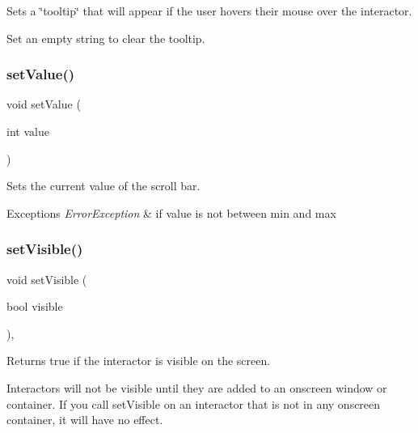 Sets a \char`\"{}tooltip\char`\"{} that will appear if the user hovers their mouse over the interactor. 

Set an empty string to clear the tooltip. \mbox{\label{classGScrollBar_a23d79e21b8ed72e19278ca31d47b8c87}} 
\subsubsection{\texorpdfstring{set\+Value()}{setValue()}}
{\footnotesize\ttfamily void set\+Value (\begin{DoxyParamCaption}\item[{int}]{value }\end{DoxyParamCaption})\hspace{0.3cm}{\ttfamily [virtual]}}



Sets the current value of the scroll bar. 


\begin{DoxyExceptions}{Exceptions}
{\em Error\+Exception} & if value is not between min and max \\
\hline
\end{DoxyExceptions}
\mbox{\label{classGInteractor_a18e44e30b31525a243960ca3928125aa}} 
\subsubsection{\texorpdfstring{set\+Visible()}{setVisible()}}
{\footnotesize\ttfamily void set\+Visible (\begin{DoxyParamCaption}\item[{bool}]{visible }\end{DoxyParamCaption})\hspace{0.3cm}{\ttfamily [virtual]}, {\ttfamily [inherited]}}



Returns true if the interactor is visible on the screen. 

Interactors will not be visible until they are added to an onscreen window or container. If you call set\+Visible on an interactor that is not in any onscreen container, it will have no effect. 

